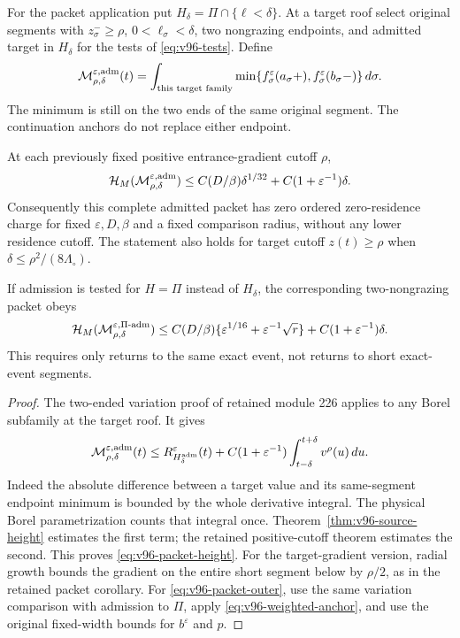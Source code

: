 For the packet application put $H_\delta=\Pi\cap\{\ell<\delta\}$.
At a target roof select original segments with $z^-_\sigma\ge\rho$,
$0<\ell_\sigma<\delta$, two nongrazing endpoints, and admitted target
in $H_\delta$ for the tests of \eqref{eq:v96-tests}. Define
\[
 \mathcal M_{\rho,\delta}^{\varepsilon,\rm adm}(t)
  =\int_{\text{this target family}}
    \min\{f_\sigma^\varepsilon(a_\sigma+),
           f_\sigma^\varepsilon(b_\sigma-)\}\,d\sigma.
\]
The minimum is still on the two ends of the same original segment.
The continuation anchors do not replace either endpoint.

\begin{theorem}
\label{thm:v96-packet-decay}
At each previously fixed positive entrance-gradient cutoff $\rho$,
\begin{equation}\label{eq:v96-packet-height}
 \mathcal H_M(\mathcal M_{\rho,\delta}^{\varepsilon,\rm adm})
 \le C(D/\beta)\delta^{1/32}
                        +C(1+\varepsilon^{-1})\delta.
\end{equation}
Consequently this complete admitted packet has zero ordered
zero-residence charge for fixed $\varepsilon,D,\beta$ and a fixed
comparison radius, without any lower residence cutoff. The statement
also holds for target cutoff $z(t)\ge\rho$ when
$\delta\le\rho^2/(8\Lambda_\circ)$.

If admission is tested for $H=\Pi$ instead of $H_\delta$, the
corresponding two-nongrazing packet obeys
\begin{equation}\label{eq:v96-packet-outer}
 \mathcal H_M(\mathcal M^{\varepsilon,\Pi\text{-}\rm adm}_{\rho,\delta})
 \le C(D/\beta)\{\varepsilon^{1/16}+\varepsilon^{-1}\sqrt r\}
                         +C(1+\varepsilon^{-1})\delta.
\end{equation}
This requires only returns to the same exact event, not returns to
short exact-event segments.
\end{theorem}
\begin{proof}
The two-ended variation proof of retained module 226 applies to any
Borel subfamily at the target roof. It gives
\[
 \mathcal M_{\rho,\delta}^{\varepsilon,\rm adm}(t)
 \le R_{H_\delta^{\rm adm}}^\varepsilon(t)
   +C(1+\varepsilon^{-1})
                       \int_{t-\delta}^{t+\delta}v^\rho(u)\,du.
\]
Indeed the absolute difference between a target value and its
same-segment endpoint minimum is bounded by the whole derivative
integral. The physical Borel parametrization counts that integral
once. Theorem~\ref{thm:v96-source-height} estimates the first term;
the retained positive-cutoff theorem estimates the second. This
proves \eqref{eq:v96-packet-height}. For the target-gradient version,
radial growth bounds the gradient on the entire short segment below
by $\rho/2$, as in the retained packet corollary.
For \eqref{eq:v96-packet-outer}, use the same variation comparison
with admission to $\Pi$, apply \eqref{eq:v96-weighted-anchor}, and
use the original fixed-width bounds for $b^\varepsilon$ and $p$.
\end{proof}

